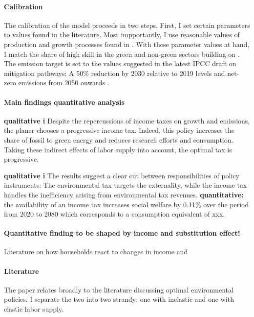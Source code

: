 \paragraph{Calibration}
The calibration of the model proceeds in two steps. First, I set certain parameters to values found in the literature. Most impportantly, I use reasonable values of production and growth processes found in \cite{Fried2018ClimateAnalysis}. %
With these parameter values at hand, I match the share of high skill in the green and non-green sectors building on \cite{Consoli2016DoCapital}. The emission target is set to the values suggested in the latest IPCC draft on mitigation pathways: A 50\% reduction by 2030 relative to 2019 levels and  net-zero emissions from 2050 onwards \citep{IPCC2022}.

\paragraph{Main findings quantitative analysis}
\textbf{qualitative i}
Despite the repercussions of income taxes on growth and emissions, the planer chooses a progressive income tax. 
Indeed, this policy increases the share of fossil to green energy and reduces research efforts and consumption. Taking these indirect effects of labor supply into account, the optimal tax is progressive. 

\textbf{qualitative i}
The results suggest a clear cut between responsibilities of policy instruments: The environmental tax targets the externality, while the income tax handles the inefficiency arising from environmental tax revenues.
\textbf{quantitative:} the availability of an income tax increases social welfare by 0.11\% over the period from 2020 to 2080 which corresponds to a consumption equivalent of xxx. 

\paragraph{Quantitative finding to be shaped by income and substitution effect!}
Literature on how households react to changes in income \cite{Bick2018HowImplications} and \cite{Boppart2019LaborPerspectiveb}


\paragraph{Literature}
 The paper relates broadly to the literature discussing optimal environmental policies. I separate the two into two strandy: one with inelastic and one with elastic labor supply. 
